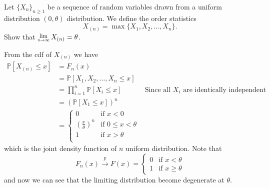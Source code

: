 \begin{example}
    Let $\{X_n \}_{n \geq 1}$ be a sequence of random variables drawn from a uniform distribution $(0, \theta)$ distribution.
    We define the order statistics
    \[
        X_{(n)} = \max \{ X_1, X_2, \ldots, X_n \}.
    \]
    Show that $\Lim{n \to \infty} X_{(n)} = \theta$.
\end{example}
\begin{solution}
    From the cdf of $X_{(n)}$ we have 
    \begin{align*}
        \mathbb{P}[X_{(n)} \leq x] &= F_n(x)\\
        &= \mathbb{P}[X_1 , X_2, \ldots, X_n \leq x]\\
        &= \prod^n_{i=1} \mathbb{P}[X_i \leq x] & \text{Since all } X_i \text{ are identically independent }\\
        &= \left( \mathbb{P}[X_1 \leq x]\right)^n\\
        &= \begin{cases}
            0 & \text{if } x < 0\\
            \left(\displaystyle \frac{x}{\theta}\right)^n & \text{if } 0 \leq x < \theta\\
            1 & \text{if } x > \theta\\
        \end{cases}
    \end{align*}
    which is the joint density function of $n$ uniform distribution. Note that
    \[
        F_n(x) \xrightarrow[]{p} F(x) = \begin{cases}
            0 & \text{if } x < \theta\\
            1 & \text{if } x \geq \theta
        \end{cases}
    \]
    and now we can see that the limiting distribution become degenerate at $\theta$.
\end{solution}

